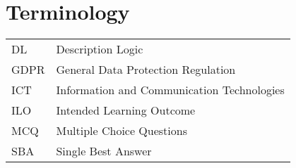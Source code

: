 \section*{Terminology}\label{sec:terminology}
{}
\begin{table}[ht!]
  \begin{tabular}{l l}
DL & Description Logic\\
GDPR & General Data Protection Regulation\\
ICT & Information and Communication Technologies\\
ILO & Intended Learning Outcome\\
MCQ & Multiple Choice Questions\\
SBA & Single Best Answer\\
\end{tabular}
\end{table}
